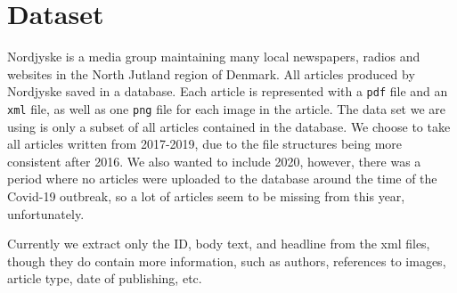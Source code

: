 \section{Dataset}
Nordjyske is a media group maintaining many local newspapers, radios and websites in the North Jutland region of Denmark.
All articles produced by Nordjyske saved in a database.
Each article is represented with a \texttt{pdf} file and an \texttt{xml} file, as well as one \texttt{png} file for each image in the article.
The data set we are using is only a subset of all articles contained in the database.
We choose to take all articles written from 2017-2019, due to the file structures being more consistent after 2016.
We also wanted to include 2020, however, there was a period where no articles were uploaded to the database around the time of the Covid-19 outbreak, so a lot of articles seem to be missing from this year, unfortunately.

Currently we extract only the ID, body text, and headline from the xml files, though they do contain more information, such as authors, references to images, article type, date of publishing, etc.
